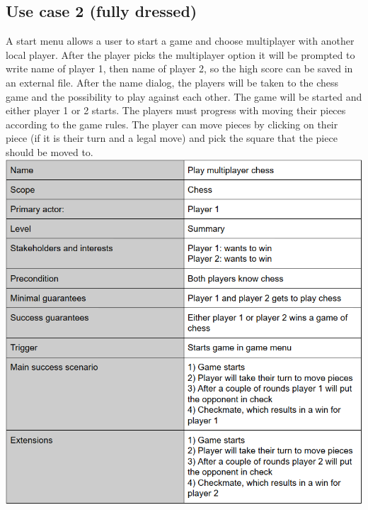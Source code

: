 \documentclass{article}
\begin{document}
        \subsection{Use case 2 (fully dressed)}
        A start menu allows a user to start a game and choose multiplayer with 
        another local player. After the player picks the multiplayer option it 
        will be prompted to write name of player 1, then name of player 2, so 
        the high score can be saved in an external file. After the name dialog,
        the players will be taken to the chess game and the possibility to play
        against each other. The game will be started and either player 1 or 2 starts.
        The players must progress with moving their pieces according to the game rules.
        The player can move pieces by clicking on their piece (if it is their 
        turn and a legal move) and pick the square that the piece should be moved
        to. \\
        \includegraphics[width=\linewidth]{play-multiplayer.png}
        
\end{document}
